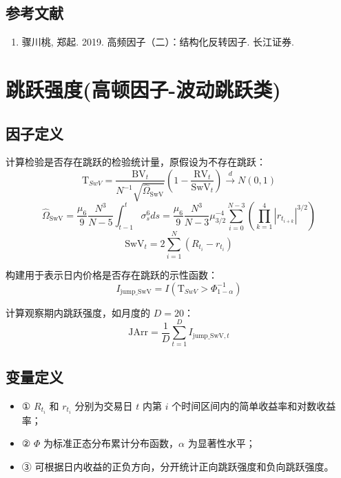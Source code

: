 \documentclass{article}
\begin{document}
\subsection{参考文献}
\begin{enumerate}
    \item 骤川桃, 郑起. 2019. 高频因子（二）：结构化反转因子. 长江证券.
\end{enumerate}

\section{跳跃强度(高顿因子-波动跳跃类)}

\subsection{因子定义}

计算检验是否存在跳跃的检验统计量，原假设为不存在跳跃：
\begin{equation}
    \mathrm{T}_{SwV} = \frac{\mathrm{BV}_t}{N^{-1}\sqrt{\hat{\Omega}_{\mathrm{SwV}}}} \left(1 - \frac{\mathrm{RV}_t}{\mathrm{SwV}_t}\right) \xrightarrow{d} N(0,1)
\end{equation}
\begin{equation}
    \hat{\Omega}_{\mathrm{SwV}} = \frac{\mu_6}{9} \frac{N^3}{N - 5} \int_{t-1}^{t} \sigma_s^6 ds = \frac{\mu_6}{9} \frac{N^3}{N - 3}\mu_{3/2}^{-4}\sum_{i=0}^{N-3} (\prod_{k=1}^4|r_{t_{i+k}}|^{3/2})
\end{equation}
\begin{equation}
    \mathrm{SwV}_t = 2 \sum_{i=1}^N (R_{t_i} - r_{t_i})
\end{equation}

构建用于表示日内价格是否存在跳跃的示性函数：
\begin{equation}
    I_{\mathrm{jump\_SwV}} = I(\mathrm{T}_{SwV} > \Phi_{1-\alpha}^{-1})
\end{equation}

计算观察期内跳跃强度，如月度的 \( D = 20 \)：
\begin{equation}
    \mathrm{JArr} = \frac{1}{D} \sum_{t=1}^D I_{\mathrm{jump\_SwV},t}
\end{equation}

\subsection{变量定义}
\begin{itemize}
    \item ① \( R_{t_i} \) 和 \( r_{t_i} \) 分别为交易日 \( t \) 内第 \( i \) 个时间区间内的简单收益率和对数收益率；
    \item ② \( \Phi \) 为标准正态分布累计分布函数，\( \alpha \) 为显著性水平；
    \item ③ 可根据日内收益的正负方向，分开统计正向跳跃强度和负向跳跃强度。
\end{itemize}
\end{document}
